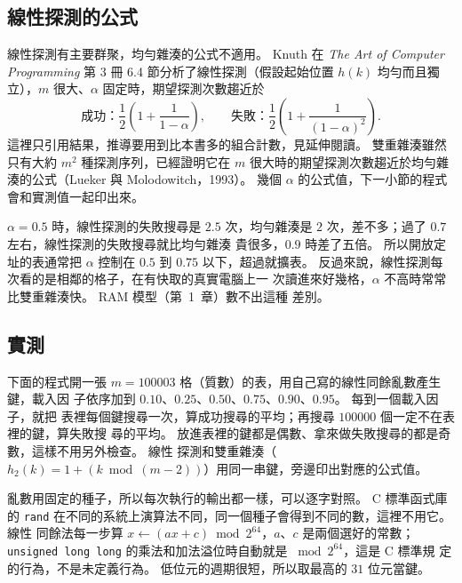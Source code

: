 \subsection{線性探測的公式}

線性探測有主要群聚，均勻雜湊的公式不適用。 Knuth 在 \textit{The Art of Computer
Programming} 第 3 冊 6.4 節分析了線性探測（假設起始位置 $h(k)$ 均勻而且獨立），$m$
很大、$\alpha$ 固定時，期望探測次數趨近於
\[
\text{成功：} \frac{1}{2}\left(1 + \frac{1}{1 - \alpha}\right), \qquad
\text{失敗：} \frac{1}{2}\left(1 + \frac{1}{(1 - \alpha)^2}\right).
\]
這裡只引用結果，推導要用到比本書多的組合計數，見延伸閱讀。 雙重雜湊雖然只有大約
$m^2$ 種探測序列，已經證明它在 $m$ 很大時的期望探測次數趨近於均勻雜湊的公式（Lueker
與 Molodowitch，1993）。 幾個 $\alpha$ 的公式值，下一小節的程式會和實測值一起印出來。

$\alpha = 0.5$ 時，線性探測的失敗搜尋是 $2.5$ 次，均勻雜湊是 $2$ 次，差不多；過了 $0.7$ 左右，線性探測的失敗搜尋就比均勻雜湊
貴很多，$0.9$ 時差了五倍。 所以開放定址的表通常把 $\alpha$ 控制在 $0.5$ 到 $0.75$
以下，超過就擴表。 反過來說，線性探測每次看的是相鄰的格子，在有快取的真實電腦上一
次讀進來好幾格，$\alpha$ 不高時常常比雙重雜湊快。 RAM 模型（第~1~章）數不出這種
差別。

\subsection{實測}
\label{sec:hash-measure}

下面的程式開一張 $m = 100003$ 格（質數）的表，用自己寫的線性同餘亂數產生鍵，載入因
子依序加到 $0.10$、$0.25$、$0.50$、$0.75$、$0.90$、$0.95$。 每到一個載入因子，就把
表裡每個鍵搜尋一次，算成功搜尋的平均；再搜尋 $100000$ 個一定不在表裡的鍵，算失敗搜
尋的平均。 放進表裡的鍵都是偶數、拿來做失敗搜尋的都是奇數，這樣不用另外檢查。 線性
探測和雙重雜湊（$h_2(k) = 1 + (k \bmod (m - 2))$）用同一串鍵，旁邊印出對應的公式值。

亂數用固定的種子，所以每次執行的輸出都一樣，可以逐字對照。 C 標準函式庫的
\texttt{rand} 在不同的系統上演算法不同，同一個種子會得到不同的數，這裡不用它。 線性
同餘法每一步算 $x \gets (ax + c) \bmod 2^{64}$，$a$、$c$ 是兩個選好的常數；
\texttt{unsigned long long} 的乘法和加法溢位時自動就是 $\bmod 2^{64}$，這是 C 標準規
定的行為，不是未定義行為。 低位元的週期很短，所以取最高的 $31$ 位元當鍵。

